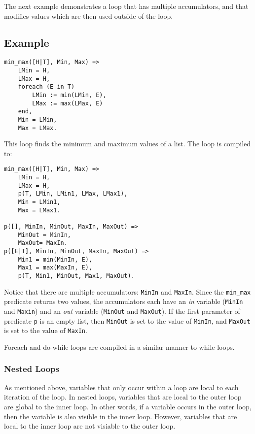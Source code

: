 The next example demonstrates a loop that has multiple accumulators, and that modifies values which are then used outside of the loop.
\subsection*{Example}
\begin{verbatim}
min_max([H|T], Min, Max) =>
    LMin = H,
    LMax = H,
    foreach (E in T)
        LMin := min(LMin, E),
        LMax := max(LMax, E)
    end,
    Min = LMin,
    Max = LMax.
\end{verbatim}

This loop finds the minimum and maximum values of a list.  The loop is compiled to:
\begin{verbatim}
min_max([H|T], Min, Max) =>
    LMin = H,
    LMax = H,
    p(T, LMin, LMin1, LMax, LMax1),
    Min = LMin1,
    Max = LMax1.

p([], MinIn, MinOut, MaxIn, MaxOut) =>
    MinOut = MinIn,
    MaxOut= MaxIn.
p([E|T], MinIn, MinOut, MaxIn, MaxOut) =>
    Min1 = min(MinIn, E),
    Max1 = max(MaxIn, E),
    p(T, Min1, MinOut, Max1, MaxOut).
\end{verbatim}
Notice that there are multiple accumulators: \texttt{MinIn} and \texttt{MaxIn}.  Since the \texttt{min\_max} predicate returns two values, the accumulators each have an \textit{in} variable (\texttt{MinIn} and \texttt{Maxin}) and an \textit{out} variable (\texttt{MinOut} and \texttt{MaxOut}).   If the first parameter of predicate \texttt{p} is an empty list, then \texttt{MinOut} is set to the value of \texttt{MinIn}, and \texttt{MaxOut} is set to the value of \texttt{MaxIn}.

Foreach and do-while loops are compiled in a similar manner to while loops.

\subsubsection{Nested Loops}
As mentioned above, variables that only occur within a loop are local to each iteration of the loop.  In nested loops, variables that are local to the outer loop are global to the inner loop.  In other words, if a variable occurs in the outer loop, then the variable is also visible in the inner loop.  However, variables that are local to the inner loop are not visiable to the outer loop.


